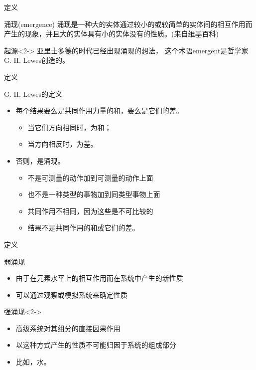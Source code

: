 \documentclass{beamer}
\begin{document}
\begin{frame}{定义}
	\begin{block}{涌现(emergence)}
涌现是一种大的实体通过较小的或较简单的实体间的相互作用而产生的现象，并且大的实体具有小的实体没有的性质。(来自维基百科)
	\end{block}
	\begin{block}{起源}<2->
		亚里士多德的时代已经出现涌现的想法， 这个术语emergent是哲学家G. H. Lewes创造的。
	\end{block}
\end{frame}
\begin{frame}{定义}
	\begin{block}{G. H. Lewes的定义}
		\begin{itemize}
			\item<2-> 每个结果要么是共同作用力量的和，要么是它们的差。
			\begin{itemize}
				\item 当它们方向相同时，为和；
				\item 当方向相反时，为差。
			\end{itemize}
			\item<3-> 否则，是涌现。
			\begin{itemize}
				\item 不是可测量的动作加到可测量的动作上面
				\item 也不是一种类型的事物加到同类型事物上面
				\item 共同作用不相同，因为这些是不可比较的
				\item 结果不是共同作用的和或它们的差。
			\end{itemize}
		\end{itemize}
	\end{block}
\end{frame}
\begin{frame}{定义}
	\begin{block}{弱涌现}
		\begin{itemize}
			\item 由于在元素水平上的相互作用而在系统中产生的新性质
			\item 可以通过观察或模拟系统来确定性质
		\end{itemize}
	\end{block}
	\begin{block}{强涌现}<2->
		\begin{itemize}
			\item 高级系统对其组分的直接因果作用
			\item 以这种方式产生的性质不可能归因于系统的组成部分
			\item 比如，水。
		\end{itemize}
	\end{block}
\end{frame}
\end{document}
